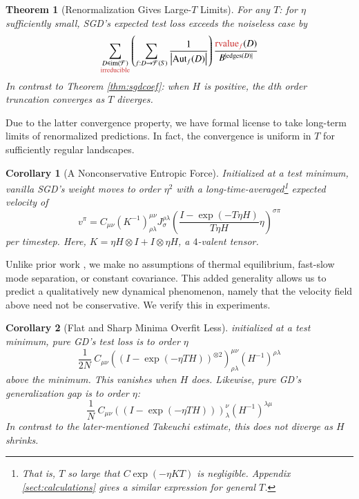 \documentclass{article}
\newtheorem{thm}{Theorem}
\newtheorem{cor}{Corollary}
\newcommand{\Free}{\mathcal{F}}
\newcommand{\Aut}{\text{\textnormal{Aut}}}
\newcommand{\image}{\text{\textnormal{im}}}
\newcommand{\rvalue}{\text{\textnormal{rvalue}}}
\newcommand{\edges}{\text{\textnormal{edges}}}
\newcommand{\wrap}[1]{\left(#1\right)}
\newcommand{\wabs}[1]{\left|#1\right|}
\begin{document}
        \begin{thm}[Renormalization Gives Large-$T$ Limits] \label{thm:renorm}
            For any $T$: for $\eta$ sufficiently small, SGD's expected test
            loss exceeds the noiseless case by 
            \begin{equation} \label{eq:renorm}
                \sum_{\substack{D \in \image(\Free)\\ \text{\color{moor} irreducible}}}
                \wrap{
                    \sum_{f: D\to\Free(S)}
                    \frac{1}{\wabs{\Aut_f(D)}}
                }
                \frac{{\color{moor} \rvalue_f}(D)}{B^{|\edges(D)|}}
            \end{equation}
            In contrast to Theorem \ref{thm:sgdcoef}: when $H$ is positive, the
            $d$th order truncation converges as $T$ diverges.
        \end{thm}
        Due to the latter convergence property, we have formal license to 
        take long-term limits of renormalized predictions.  In fact, the
        convergence is uniform in $T$ for sufficiently regular landscapes.
        \begin{cor}[A Nonconservative Entropic Force]\label{cor:entropic}
            Initialized at a test minimum, vanilla SGD's weight moves to
            order $\eta^2$ with a long-time-averaged\footnote{
                That is, $T$ so large that $C \exp(-\eta K T)$ is negligible.
                Appendix \ref{sect:calculations} gives a similar expression for general $T$.
            }
            expected velocity of
            $$
                v^\pi = C_{\mu \nu}
                \wrap{K^{-1}}^{\mu\nu}_{\rho\lambda}
                J^{\rho\lambda}_{\sigma}
                \wrap{\frac{I - \exp(-T \eta H)}{T \eta H} \eta}^{\sigma \pi}
            $$
            per timestep.
            Here, $K = \eta H \otimes I + I \otimes \eta H$, a
            $4$-valent tensor. 
        \end{cor}
        Unlike prior work \cite{we19b}, we make no assumptions of
        thermal equilibrium, fast-slow mode separation, or constant covariance.
        This added generality allows us to predict a qualitatively new
        dynamical phenomenon, namely that the velocity field above need not be
        conservative.  We verify this in experiments.
        \begin{cor}[Flat and Sharp Minima Overfit Less]\label{cor:overfit}
            initialized at a test minimum, pure GD's test loss is to
            order $\eta$
            $$
                \frac{1}{2N} ~
                    C_{\mu\nu}
                    \wrap{(I - \exp(-\eta T H))^{\otimes 2}}^{\mu\nu}_{\rho\lambda}
                    \wrap{H^{-1}}^{\rho\lambda}
            $$
            above the minimum.  This vanishes when $H$ does. 
            Likewise, pure GD's generalization gap is to order $\eta$:  
            $$
                \frac{1}{N} ~
                    C_{\mu\nu}
                    \wrap{(I - \exp(-\eta T H))}^{\nu}_{\lambda}
                    \wrap{H^{-1}}^{\lambda\mu}
            $$
            In contrast to the later-mentioned Takeuchi estimate, this does not
            diverge as $H$ shrinks.
        \end{cor}
\end{document}
